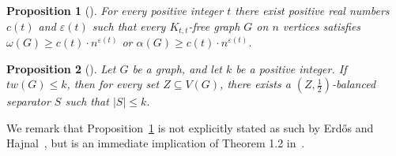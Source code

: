 \documentclass[11pt]{amsart}
\newtheorem{theorem}{Theorem}[section]
\newtheorem{proposition}[theorem]{Proposition}
\newcommand{\tw}{tw\xspace}
\newcommand{\atw}{tw_{\alpha}\xspace}
\begin{document}
\begin{proposition}[\cite{erdos1989ramsey}]\label{prop:erdos_hajnal}
    For every positive integer $t$ there exist positive real numbers $c(t)$ and $\varepsilon(t)$ such that every $K_{t,t}$-free graph $G$ on $n$ vertices satisfies $\omega(G) \geq c(t)\cdot n^{\varepsilon(t)}$ or $\alpha(G) \geq c(t)\cdot n^{\varepsilon(t)}$.
\end{proposition}
\begin{proposition}[\cite{cygan2015parameterized}]\label{prop:tree_width_separator}
    Let $G$ be a graph, and let $k$ be a positive integer. If $\tw(G)\leq k$, then for every set $Z \subseteq V(G)$, there exists a $(Z,\frac{1}{2})$-balanced separator $S$ such that $|S|\leq k$.
\end{proposition}

We remark that Proposition~\ref{prop:erdos_hajnal} is not explicitly stated as such by Erd\H{o}s and Hajnal~\cite{erdos1989ramsey}, but is an immediate implication of Theorem 1.2 in~\cite{erdos1989ramsey}. 


\MainThmTreeAlpha*


\end{document}
